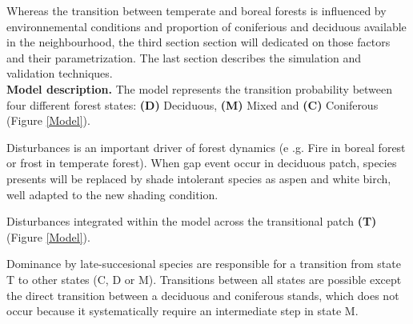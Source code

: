 
Whereas the transition between temperate and boreal forests is influenced by
environnemental conditions and proportion of coniferious and deciduous
available in the neighbourhood, the third section section will dedicated on
those factors and their parametrization. The last section describes the
simulation and validation techniques.\\


\textbf{Model description.} The model represents the transition probability
between four different forest states: \textbf{(D)} Deciduous, \textbf{(M)}
Mixed and \textbf{(C)} Coniferous (Figure \ref{Model}).


Disturbances is an important driver of forest dynamics (e .g. Fire in boreal
forest or frost in temperate forest). When gap event occur in deciduous patch,
species presents will be replaced by shade intolerant species as aspen and
white birch, well adapted to the new shading condition.


Disturbances  integrated within the model across the transitional patch
\textbf{(T)} (Figure \ref{Model}).


Dominance by late-succesional species are responsible for a transition from
state T to other states (C, D or M). Transitions between all states are
possible  except the direct transition between a deciduous and coniferous
stands, which does not occur because it systematically require an intermediate
step in state M.


